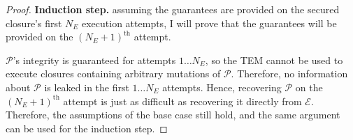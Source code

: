 \begin {proof}
\textbf{Induction step.} assuming the guarantees are provided on the secured
closure's first $N_E$ execution attempts, I will prove that the guarantees will
be provided on the $(N_E + 1)^\textrm{th}$ attempt.

$\mathcal P$'s integrity is guaranteed for attempts $1 \ldots N_E$, so the TEM
cannot be used to execute closures containing arbitrary mutations of $\mathcal
P$. Therefore, no information about $\mathcal P$ is leaked in the first $1
\ldots N_E$ attempts. Hence, recovering $\mathcal P$ on the $(N_E +
1)^\textrm{th}$ attempt is just as difficult as recovering it directly from $\mathcal E$.
Therefore, the assumptions of the base case still hold, and the same argument
can be used for the induction step.
\end{proof}
